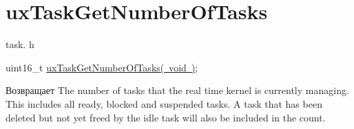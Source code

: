 \hypertarget{group__ux_task_get_number_of_tasks}{}\section{ux\+Task\+Get\+Number\+Of\+Tasks}
\label{group__ux_task_get_number_of_tasks}
task. h 
\begin{DoxyPre}uint16\_t \mbox{\hyperlink{task_8h_a70a89a0f07c7db5d695707d1f6f44a4a}{uxTaskGetNumberOfTasks( void )}};\end{DoxyPre}


\begin{DoxyReturn}{Возвращает}
The number of tasks that the real time kernel is currently managing. This includes all ready, blocked and suspended tasks. A task that has been deleted but not yet freed by the idle task will also be included in the count. 
\end{DoxyReturn}

